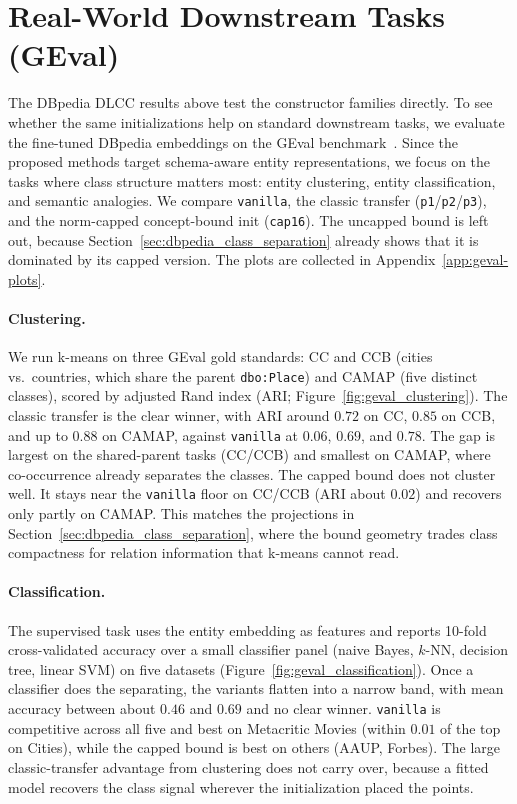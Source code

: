 \documentclass[a4paper,oneside,bibliography=totoc]{scrbook}
\begin{document}
\section{Real-World Downstream Tasks (GEval)}
\label{sec:dbpedia_geval}

The DBpedia DLCC results above test the constructor families directly. To see
whether the same initializations help on standard downstream tasks, we evaluate
the fine-tuned DBpedia embeddings on the GEval
benchmark~\cite{pellegrino_configurable_2019,pellegrino_geval_2020}. Since the proposed methods target
schema-aware entity representations, we focus on the tasks where class structure
matters most: entity clustering, entity classification, and semantic analogies.
We compare \texttt{vanilla}, the classic transfer
(\texttt{p1}/\texttt{p2}/\texttt{p3}), and the norm-capped concept-bound init
(\texttt{cap16}). The uncapped bound is left out, because
Section~\ref{sec:dbpedia_class_separation} already shows that it is dominated by
its capped version. The plots are collected in Appendix~\ref{app:geval-plots}.

\paragraph{Clustering.} We run k-means on three GEval gold standards: CC and CCB
(cities vs.\ countries, which share the parent \texttt{dbo:Place}) and CAMAP
(five distinct classes), scored by adjusted Rand index (ARI;
Figure~\ref{fig:geval_clustering}). The classic transfer is the clear winner,
with ARI around $0.72$ on CC, $0.85$ on CCB, and up to $0.88$ on CAMAP, against
\texttt{vanilla} at $0.06$, $0.69$, and $0.78$. The gap is largest on the
shared-parent tasks (CC/CCB) and smallest on CAMAP, where co-occurrence already
separates the classes. The capped bound does not cluster well. It stays near the
\texttt{vanilla} floor on CC/CCB (ARI about $0.02$) and recovers only partly on
CAMAP. This matches the projections in
Section~\ref{sec:dbpedia_class_separation}, where the bound geometry trades class
compactness for relation information that k-means cannot read.

\paragraph{Classification.} The supervised task uses the entity embedding as
features and reports 10-fold cross-validated accuracy over a small classifier
panel (naive Bayes, $k$-NN, decision tree, linear SVM) on five datasets
(Figure~\ref{fig:geval_classification}). Once a classifier does the separating,
the variants flatten into a narrow band, with mean accuracy between about $0.46$
and $0.69$ and no clear winner. \texttt{vanilla} is competitive across all five
and best on Metacritic Movies (within $0.01$ of the top on Cities), while the
capped bound is best on others (AAUP, Forbes). The large classic-transfer advantage from clustering does not carry
over, because a fitted model recovers the class signal wherever the
initialization placed the points.
\end{document}
